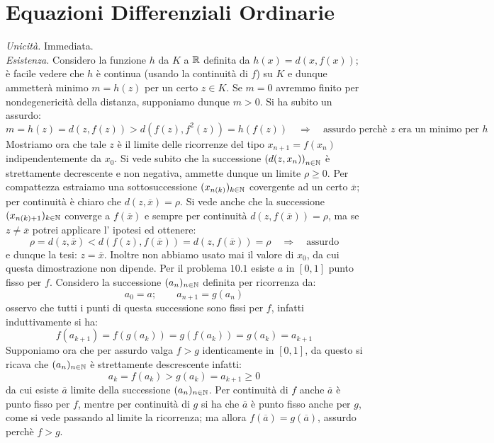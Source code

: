 \section{Equazioni Differenziali Ordinarie}
 {\it Unicità.} Immediata.\\
{\it Esistenza.} Considero la funzione $h$ da $K$ a $\mathbb{R}$ definita da $h(x)=d(x,f(x))$; è facile vedere che $h$ è continua (usando la continuità di $f$) su $K$ e dunque ammetterà minimo $m=h(z)$ per un certo $z\in K$. Se $m=0$ avremmo finito per nondegenericità della distanza, supponiamo dunque $m>0$. Si ha subito un assurdo:
$$
m=h(z)=d(z,f(z))>d(f(z),f^2(z))=h(f(z))\quad \Rightarrow\quad\mbox{assurdo perchè $z$ era un minimo per $h$} 
$$ 
Mostriamo ora che tale $z$ è il limite delle ricorrenze del tipo $x_{n+1}=f(x_n)$ indipendentemente da $x_0$. Si vede subito che la successione $\left (d(z,x_n) \right )_{n\in\mathbb{N}}$ è strettamente decrescente e non negativa, ammette dunque un limite $\rho\geq 0$. Per compattezza estraiamo una sottosuccessione $(x_{n(k)})_{k\in\mathbb{N}}$ covergente ad un certo $\overline{x}$; per continuità è chiaro che $d(z,\overline{x})=\rho$. Si vede anche che la successione $(x_{n(k)+1})_{k\in\mathbb{N}}$ converge a $f(\overline{x})$ e sempre per continuità $d(z,f(\overline{x}))=\rho$, ma se $z\neq\overline{x}$ potrei applicare l' ipotesi ed ottenere:
$$
\rho=d(z,\overline{x})<d(f(z),f(\overline{x}))=d(z,f(\overline{x}))=\rho\quad \Rightarrow \quad \mbox{assurdo}
$$
e dunque la tesi: $z=\overline{x}$. Inoltre non abbiamo usato mai il valore di $x_0$, da cui questa dimostrazione non dipende.
 Per il problema $10.1$ esiste $a$ in $[0,1]$ punto fisso per $f$. Considero la successione $(a_n)_{n\in\mathbb{N}}$ definita per ricorrenza da:
$$
a_0=a;\qquad a_{n+1}=g(a_n)
$$
osservo che tutti i punti di questa successione sono fissi per $f$, infatti induttivamente si ha:
$$
f(a_{k+1})=f(g(a_k))=g(f(a_k))=g(a_k)=a_{k+1}
$$
Supponiamo ora che per assurdo valga $f>g$ identicamente in $[0,1]$, da questo si ricava che $(a_n)_{n\in\mathbb{N}}$ è strettamente descrescente infatti:
$$
a_k=f(a_k)>g(a_k)=a_{k+1}\geq 0
$$
da cui esiste $\overline{a}$ limite della successione $(a_n)_{n\in\mathbb{N}}$. Per continuità di $f$ anche $\overline{a}$ è punto fisso per $f$, mentre per continuità di $g$ si ha che $\overline{a}$ è punto fisso anche per $g$, come si vede passando al limite la ricorrenza; ma allora $f(\overline{a})=g(\overline{a})$, assurdo perchè $f>g$.

